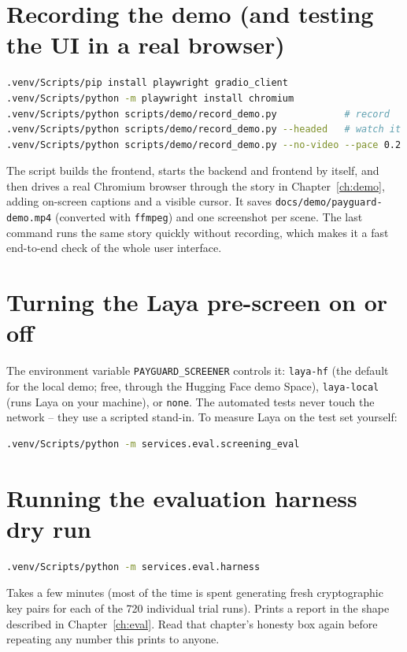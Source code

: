 \documentclass[11pt]{report}
\newcommand{\file}[1]{\texttt{#1}}
\newcommand{\code}[1]{\texttt{#1}}
\begin{document}
\section{Recording the demo (and testing the UI in a real browser)}

\begin{lstlisting}[language=bash]
.venv/Scripts/pip install playwright gradio_client
.venv/Scripts/python -m playwright install chromium
.venv/Scripts/python scripts/demo/record_demo.py            # record
.venv/Scripts/python scripts/demo/record_demo.py --headed   # watch it
.venv/Scripts/python scripts/demo/record_demo.py --no-video --pace 0.2
\end{lstlisting}

The script builds the frontend, starts the backend and frontend by
itself, and then drives a real Chromium browser through the story in
Chapter~\ref{ch:demo}, adding on-screen captions and a visible cursor. It
saves \file{docs/demo/payguard-demo.mp4} (converted with \code{ffmpeg})
and one screenshot per scene. The last command runs the same story
quickly without recording, which makes it a fast end-to-end check of the
whole user interface.

\section{Turning the Laya pre-screen on or off}

The environment variable \code{PAYGUARD\_SCREENER} controls it:
\code{laya-hf} (the default for the local demo; free, through the Hugging
Face demo Space), \code{laya-local} (runs Laya on your machine), or
\code{none}. The automated tests never touch the network -- they use a
scripted stand-in. To measure Laya on the test set yourself:

\begin{lstlisting}[language=bash]
.venv/Scripts/python -m services.eval.screening_eval
\end{lstlisting}

\section{Running the evaluation harness dry run}

\begin{lstlisting}[language=bash]
.venv/Scripts/python -m services.eval.harness
\end{lstlisting}

Takes a few minutes (most of the time is spent generating fresh
cryptographic key pairs for each of the 720 individual trial runs).
Prints a report in the shape described in Chapter~\ref{ch:eval}. Read
that chapter's honesty box again before repeating any number this prints
to anyone.
\end{document}
